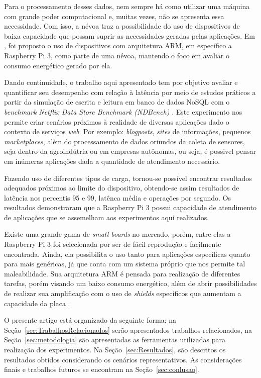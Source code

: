 \documentclass[12pt,english,brazil]{article}
\begin{document}
Para o processamento desses dados, nem sempre há como utilizar uma máquina com grande poder computacional e, muitas vezes, não se apresenta essa necessidade. Com isso, a névoa traz a possibilidade do uso de dispositivos de baixa capacidade que possam suprir as necessidades geradas pelas aplicações. Em \cite{eu}, foi proposto o uso de dispositivos com arquitetura ARM, em específico a Raspberry Pi 3, como parte de uma névoa, mantendo o foco em avaliar o consumo energético gerado por ela.

Dando continuidade, o trabalho aqui apresentado tem por objetivo avaliar e quantificar seu desempenho com relação à latência por meio de estudos práticos a partir da simulação de escrita e leitura em banco de dados NoSQL com o \textit{benchmark} \textit{Netflix Data Store Benchmark (NDBench)} \cite{NDBenchPAPER}. Este experimento nos permite criar cenários próximos à realidade de diversas aplicações dado o contexto de serviços \textit{web}. Por exemplo: \textit{blogposts}, \textit{sites} de informações, pequenos \textit{marketplaces}, além do processamento de dados oriundos da coleta de sensores, seja dentro da agroindútria ou em empresas autônomas, ou seja, é possivel pensar em inúmeras aplicações dada a quantidade de atendimento necessário. 

Fazendo uso de diferentes tipos de carga, tornou-se possível encontrar resultados adequados próximos ao limite do dispositivo, obtendo-se assim resultados de latência nos percentis 95 e 99, latênca média e operações por segundo. Os resultados demonstraram que a Raspberry Pi 3 possui capacidade de atendimento de aplicações que se assemelham aos experimentos aqui realizados.

Existe uma grande gama de \textit{small boards} no mercado, porém, entre elas a Raspberry Pi 3 foi selecionada por ser de fácil reprodução e facilmente encontrada. Ainda,  ela possibilita o uso tanto para aplicações específicas quanto para mais genéricas, já que conta com um sistema próprio que nos permite tal maleabilidade. Sua arquitetura ARM é pensada para realização de diferentes tarefas, porém visando um baixo consumo energético, além de abrir possibilidades de realizar sua amplificação com o uso de \textit{shields} específicos que aumentam a capacidade da placa \cite{maksimovic2014raspberry}.

O presente artigo está organizado da seguinte forma: na Seção~\ref{sec:TrabalhosRelacionados} serão apresentados trabalhos relacionados, na Seção~\ref{sec:metodologia} são apresentadas as ferramentas utilizadas para realização dos experimentos. Na Seção~\ref{sec:Resultados}, são descritos os resultados obtidos considerando os cenários representativos. As considerações finais e trabalhos futuros se encontram na Seção~\ref{sec:conlusao}.
\end{document}
